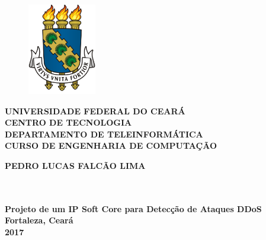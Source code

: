 \thispagestyle{empty}

\vfill
 \begin{center}
    \begin{figure}[t]
     \centering
            \includegraphics[width=3cm]{figures/UFC_logo_sem_t_tulo.png}\\[-0.1in]
     \end{figure}

    {\large\bfseries UNIVERSIDADE FEDERAL DO CEARÁ} \\
    {\large\bfseries CENTRO DE TECNOLOGIA} \\
    {\large\bfseries DEPARTAMENTO DE TELEINFORMÁTICA}  \\ 
    {\large\bfseries CURSO DE ENGENHARIA DE COMPUTAÇÃO}  \\ 

    \vspace*{1in}
    \begin{large} \bfseries PEDRO LUCAS FALCÃO LIMA \end{large}\\[0.4in]

    \vspace*{4cm}
    \noindent \\
    \large\bfseries{Projeto de um IP Soft Core para Detecção de Ataques DDoS} \\
    \vfill
    \large\bfseries{ Fortaleza, Ceará \\ 2017}
\end{center}

\normalsize